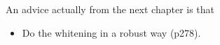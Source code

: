 \documentclass[a4paper, one	side]{book}
\begin{document}
An advice actually from the next chapter is that

\begin{itemize}
\item Do the whitening in a robust way (p278).
\end{itemize}


































\printindex
\end{document}
